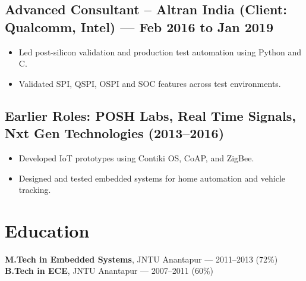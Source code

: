 \documentclass[10pt]{article}
\begin{document}
\subsection*{Advanced Consultant – Altran India (Client: Qualcomm, Intel) — Feb 2016 to Jan 2019}
\begin{itemize}[leftmargin=*]
  \item Led post-silicon validation and production test automation using Python and C.
  \item Validated SPI, QSPI, OSPI and SOC features across test environments.
\end{itemize}

\subsection*{Earlier Roles: POSH Labs, Real Time Signals, Nxt Gen Technologies (2013–2016)}
\begin{itemize}[leftmargin=*]
  \item Developed IoT prototypes using Contiki OS, CoAP, and ZigBee.
  \item Designed and tested embedded systems for home automation and vehicle tracking.
\end{itemize}

\section*{Education}
\textbf{M.Tech in Embedded Systems}, JNTU Anantapur — 2011–2013 \hfill (72\%) \\
\textbf{B.Tech in ECE}, JNTU Anantapur — 2007–2011 \hfill (60\%)
\end{document}
